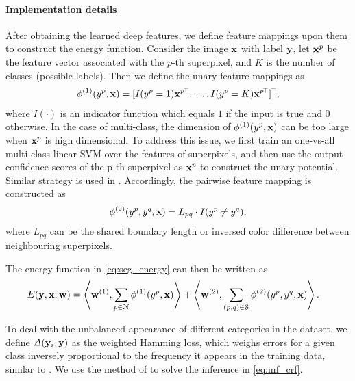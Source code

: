 \documentclass[10pt,3p]{elsarticle}
\def\T{{\!\top}}
\def\bw{{\bf w}}
\def\bx{{\bf x}}
\def\by{{\bf y}}
\let\x\bx
\let\y\by
\let\w\bw
\def\loss{{\it \Delta}}
\begin{document}
\paragraph{\bf{Implementation details}}
After obtaining the learned deep features, we define feature mappings upon them to construct the energy function. Consider the image $\x$ with label $\y$, let $\x^p$ be the feature vector associated with the $p$-th superpixel, and $K$ is the number of classes (possible labels). Then we define the unary feature mappings as
\begin{align}
\phi^{(1)}(y^p, \x)=[I(y^p=1)\x^{p \T}, \ldots, I(y^p=K)\x^{p\T}]^\T,
\end{align}
where $I(\cdot)$ is an indicator function which equals $1$ if the input is true and $0$ otherwise.
In the case of multi-class, the dimension of $\phi^{(1)}(y^p, \x)$ can be too large when $\x^p$ is high dimensional. To address this issue, we first train an one-vs-all multi-class linear SVM over the features of superpixels, and then use the output confidence scores of the p-th superpixel as $\x^p$ to construct the unary potential.
Similar strategy is used in \cite{Fulkerson09,Lucchi12}.
Accordingly, the pairwise feature mapping is constructed as
\begin{align}
\label{eq:pairwise_feat}
\phi^{(2)}(y^p, y^q, \x)= L_{pq} \cdot I(y^p \neq y^q),
\end{align}
where $L_{pq}$ can be the shared boundary length or  inversed color difference between neighbouring superpixels.

The energy function in \eqref{eq:seg_energy} can then be written as
\begin{align}
\label{eq:energy}
	E(\y, \x; \w)& = \left\langle \w^{(1)},  \sum_{p \in {\cal N} } \phi^{(1)}(y^{p}, \x) \right \rangle
	 +  \left\langle \w^{(2)}, \sum_{(p,q) \in {\cal S}} \phi^{(2)}(y^{p}, y^{q}, \x) \right\rangle.
\end{align}

To deal with the unbalanced appearance of different categories in the dataset, we define $\loss ( \y_i, \y)$ as the weighted Hamming loss, which weighs errors for a given class inversely proportional to the frequency it appears in the training data, similar to \cite{Lucchi12}.
We use the method of \cite{Zhangzhen13} to solve the inference in \eqref{eq:inf_crf}.
\end{document}
